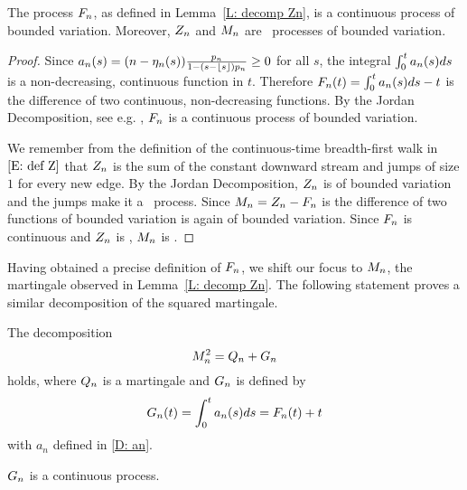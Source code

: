 \begin{corollary}
	The process $F_n$, as defined in Lemma~\ref{L: decomp Zn}, is a continuous process of bounded variation.
	Moreover, $Z_n$ and $M_n$ are \cadlag~processes of bounded variation.
\end{corollary}

\begin{proof}
	Since $a_n(s) = (n - \eta_n(s)) \frac{p_n}{1-(s-\lfloor s\rfloor)p_n} \geq 0$ for all $s$,
	the integral $\int_{0}^{t}a_n(s)ds$ is a non-decreasing, continuous function in $t$.
	Therefore $F_n(t) = \int_{0}^{t}a_n(s)ds -t$ is the difference of two continuous, non-decreasing functions.
	By the Jordan Decomposition, see e.g. \cite[Proposition 22, p.236]{Royden.1969}, $F_n$ is a continuous process of bounded variation.
	
	We remember from the definition of the continuous-time breadth-first walk in $\eqref{E: def Z}$
	that $Z_n$ is the sum of the constant downward stream and jumps of size $1$ for every new edge.
	By the Jordan Decomposition, $Z_n$ is of bounded variation and the jumps make it a \cadlag~process.
	Since $M_n = Z_n - F_n$ is the difference of two functions of bounded variation is again of bounded variation.
	Since $F_n$ is continuous and $Z_n$ is \cadlag, $M_n$ is \cadlag.
\end{proof}



Having obtained a precise definition of $F_n$, we shift our focus to $M_n$, the martingale observed in Lemma~\ref{L: decomp Zn}.
The following statement proves a similar decomposition of the squared martingale.

\begin{lemma} \label{L: decomp Mn}
	The decomposition
	\begin{equation} \label{E: decomp Mn}
	M_n^2 = Q_n + G_n
	\end{equation}
	holds, where $Q_n$ is a martingale and $G_n$ is defined by 
	\begin{equation} \label{D: Bn}
	G_n(t) = \int_{0}^{t} a_n(s)ds = F_n(t) + t
	\end{equation}
	with $a_n$ defined in \eqref{D: an}.
\end{lemma}
\begin{note} \label{N: decomp Mn}
	$G_n$ is a continuous process.
\end{note}

